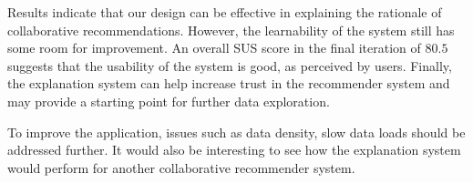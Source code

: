 \documentclass[a4paper,10pt,twocolumn]{article}
\begin{document}
Results indicate that our design can be effective in explaining the rationale of collaborative recommendations. However, the learnability of the system still has some room for improvement. An overall SUS score in the final iteration of $80.5$ suggests that the usability of the system is good, as perceived by users. Finally, the explanation system can help increase trust in the recommender system and may provide a starting point for further data exploration.

To improve the application, issues such as data density, slow data loads should be addressed further. It would also be interesting to see how the explanation system would perform for another collaborative recommender system.





\end{document}
